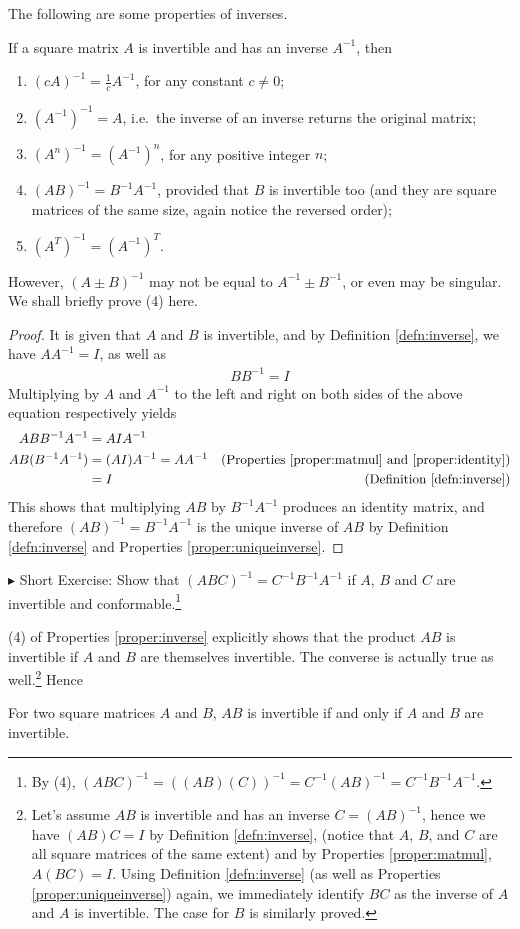 The following are some properties of inverses.
\begin{proper}
\label{proper:inverse}
If a square matrix $A$ is invertible and has an inverse $A^{-1}$, then
\begin{enumerate}
\item $(cA)^{-1} = \frac{1}{c}A^{-1}$, for any constant $c \neq 0$;
\item $(A^{-1})^{-1} = A$, i.e.\ the inverse of an inverse returns the original matrix;
\item $(A^n)^{-1} = (A^{-1})^n$, for any positive integer $n$;
\item $(AB)^{-1} = B^{-1}A^{-1}$, provided that $B$ is invertible too (and they are square matrices of the same size, again notice the reversed order);
\item $(A^T)^{-1} = (A^{-1})^T$.
\end{enumerate}
\end{proper}
However, $(A\pm B)^{-1}$ may not be equal to $A^{-1} \pm B^{-1}$, or even may be singular. We shall briefly prove (4) here.
\begin{proof}
It is given that $A$ and $B$ is invertible, and by Definition \ref{defn:inverse}, we have $AA^{-1} = I$, as well as 
\begin{align*}
BB^{-1} = I    
\end{align*}
Multiplying by $A$ and $A^{-1}$ to the left and right on both sides of the above equation respectively yields
\begin{align*}
ABB^{-1}A^{-1} &= AIA^{-1} \\
AB(B^{-1}A^{-1}) &= (AI)A^{-1} = AA^{-1} & \text{(Properties \ref{proper:matmul} and \ref{proper:identity})} \\
&= I & \text{(Definition \ref{defn:inverse})}
\end{align*}
This shows that multiplying $AB$ by $B^{-1}A^{-1}$ produces an identity matrix, and therefore $(AB)^{-1} = B^{-1}A^{-1}$ is the unique inverse of $AB$ by Definition \ref{defn:inverse} and Properties \ref{proper:uniqueinverse}.
\end{proof}
$\blacktriangleright$ Short Exercise: Show that $(ABC)^{-1} = C^{-1}B^{-1}A^{-1}$ if $A$, $B$ and $C$ are invertible and conformable.\footnote{By (4), $(ABC)^{-1} = ((AB)(C))^{-1} = C^{-1}(AB)^{-1} = C^{-1}B^{-1}A^{-1}$.}\par
(4) of Properties \ref{proper:inverse} explicitly shows that the product $AB$ is invertible if $A$ and $B$ are themselves invertible. The converse is actually true as well.\footnote{Let's assume $AB$ is invertible and has an inverse $C = (AB)^{-1}$, hence we have $(AB)C = I$ by Definition \ref{defn:inverse}, (notice that $A$, $B$, and $C$ are all square matrices of the same extent) and by Properties \ref{proper:matmul}, $A(BC) = I$. Using Definition \ref{defn:inverse} (as well as Properties \ref{proper:uniqueinverse}) again, we immediately identify $BC$ as the inverse of $A$ and $A$ is invertible. The case for $B$ is similarly proved.} Hence
\begin{proper}
\label{proper:ABinv}
For two square matrices $A$ and $B$, $AB$ is invertible if and only if $A$ and $B$ are invertible.
\end{proper}

